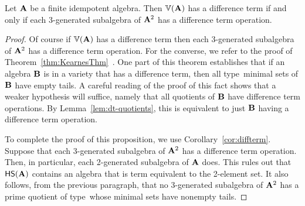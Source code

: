 %


\begin{prop}\label{prop:alt-poly-alg}
  Let $\mathbf{A}$ be a finite idempotent algebra.  Then $\operatorname{\mathbb{V}} (\mathbf{A})$ has a difference term if and only if each 3-generated subalgebra of $\mathbf{A}^2$ has a difference term operation.
\end{prop}

\begin{proof}
  Of course if $\operatorname{\mathbb{V}} (\mathbf{A})$ has a difference term then each 3-generated subalgebra of
  $\mathbf{A}^2$ has a difference term operation. For the converse, we refer to the proof of
  Theorem~\ref{thm:KearnesThm}~\cite[Theorem 3.8]{MR1358491}.  One part of this theorem
  establishes that if an algebra $\mathbf{B}$ is in a variety that has a difference term,
  then all type~\atyp minimal sets of $\mathbf{B}$ have empty tails.  A careful reading of the
  proof of this fact shows that a weaker hypothesis will suffice, namely that all quotients
  of $\mathbf{B}$ have difference term operations.  By Lemma~\ref{lem:dt-quotients}, this is
  equivalent to just $\mathbf{B}$ having a difference term operation.

  To complete the proof of this proposition, we use Corollary~\ref{cor:diffterm}. Suppose that each 3-generated subalgebra of $\mathbf{A}^2$ has a difference term operation.  Then, in particular, each 2-generated subalgebra of $\mathbf{A}$ does.  This rules out that $\mathsf{H} \mathsf{S} (\mathbf{A})$ contains an algebra that is term equivalent to the 2-element set.  It also follows, from the previous paragraph, that no 3-generated subalgebra of $\mathbf{A}^2$ has a prime quotient of type~\atyp whose minimal sets have nonempty tails.
\end{proof}

